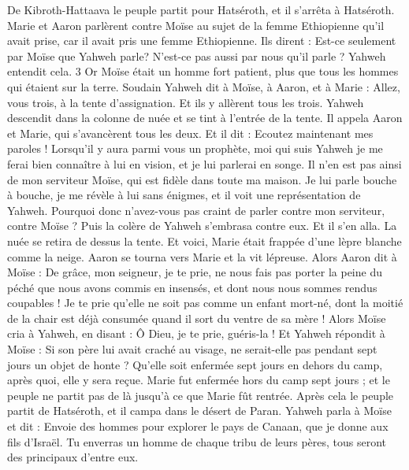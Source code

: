 \begin{multicols}{2}
De Kibroth-Hattaava le peuple partit pour Hatséroth, et il s'arrêta à Hatséroth.
\VerseOne{}Marie et Aaron parlèrent contre Moïse au sujet de la femme Ethiopienne qu'il avait prise, car il avait pris une femme Ethiopienne.
Ils dirent : Est-ce seulement par Moïse que Yahweh parle? N’est-ce pas aussi par nous qu’il parle ? Yahweh entendit cela. 3 Or Moïse était un homme fort patient, plus que tous les hommes qui étaient sur la terre.
Soudain Yahweh dit à Moïse, à Aaron, et à Marie : Allez, vous trois, à la tente d'assignation. Et ils y allèrent tous les trois.
Yahweh descendit dans la colonne de nuée et se tint à l'entrée de la tente. Il appela Aaron et Marie, qui s’avancèrent tous les deux.
Et il dit : Ecoutez maintenant mes paroles ! Lorsqu’il y aura parmi vous un prophète, moi qui suis Yahweh je me ferai bien connaître à lui en vision, et je lui parlerai en songe.
Il n'en est pas ainsi de mon serviteur Moïse, qui est fidèle dans toute ma maison.
Je lui parle bouche à bouche, je me révèle à lui sans énigmes, et il voit une représentation de Yahweh. Pourquoi donc n’avez-vous pas craint de parler contre mon serviteur, contre Moïse ?
Puis la colère de Yahweh s'embrasa contre eux. Et il s'en alla.
La nuée se retira de dessus la tente. Et voici, Marie était frappée d’une lèpre blanche comme la neige. Aaron se tourna vers Marie et la vit lépreuse.
Alors Aaron dit à Moïse : De grâce, mon seigneur, je te prie, ne nous fais pas porter la peine du péché que nous avons commis en insensés, et dont nous nous sommes rendus coupables !
Je te prie qu'elle ne soit pas comme un enfant mort-né, dont la moitié de la chair est déjà consumée quand il sort du ventre de sa mère !
Alors Moïse cria à Yahweh, en disant : Ô Dieu, je te prie, guéris-la !
Et Yahweh répondit à Moïse : Si son père lui avait craché au visage, ne serait-elle pas pendant sept jours un objet de honte ? Qu'elle soit enfermée sept jours en dehors du camp, après quoi, elle y sera reçue.
Marie fut enfermée hors du camp sept jours ; et le peuple ne partit pas de là jusqu'à ce que Marie fût rentrée.
Après cela le peuple partit de Hatséroth, et il campa dans le désert de Paran.
\VerseOne{}Yahweh parla à Moïse et dit :
Envoie des hommes pour explorer le pays de Canaan, que je donne aux fils d'Israël. Tu enverras un homme de chaque tribu de leurs pères, tous seront des principaux d'entre eux.

\end{multicols}
